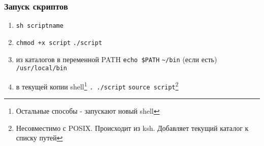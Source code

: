 \begin{frame}[fragile]
  \frametitle{Запуск скриптов}
  \begin{enumerate} 
    \item \verb+sh scriptname+
    \item \verb-chmod +x script- \newline \verb+./script+
    \item из каталогов в переменной PATH 
      \newline \verb+echo $PATH+
      \newline \verb+~/bin+ (если есть)
      \newline \verb+/usr/local/bin+
    \item в текущей копии shell\footnote{ Остальные способы - запускают новый shell}
      \newline \verb+. ./script+
      \newline \verb+source script+\footnote{ Несовместимо с POSIX. Происходит из ksh. Добавляет текущий каталог к списку путей}
  \end{enumerate}
\end{frame}
